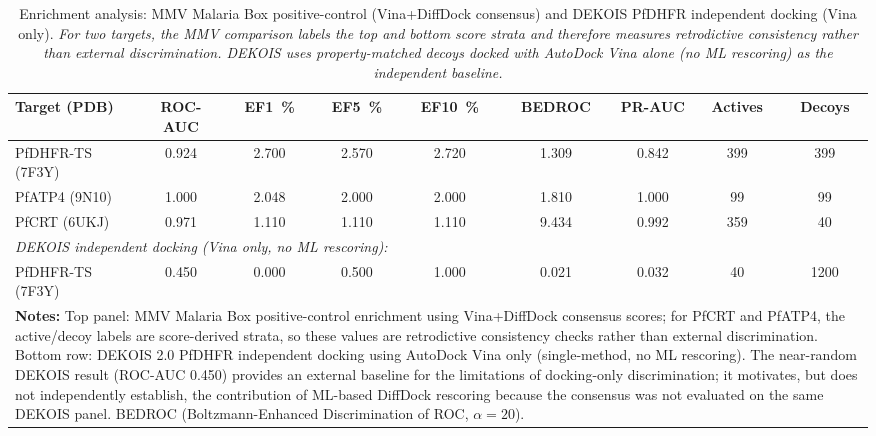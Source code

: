 \documentclass[journal=jcisd8,manuscript=suppinfo]{achemso}
\begin{document}
\begin{table}[!htbp]
\centering
\caption{Enrichment analysis: MMV Malaria Box positive-control (Vina+DiffDock consensus) and DEKOIS PfDHFR independent docking (Vina only). \textit{For two targets, the MMV comparison labels the top and bottom score strata and therefore measures retrodictive consistency rather than external discrimination. DEKOIS uses property-matched decoys docked with AutoDock Vina alone (no ML rescoring) as the independent baseline.}}
\scriptsize
\begin{tabular}{lcccccccc}
\toprule
\textbf{Target (PDB)} & \textbf{ROC-AUC} & \textbf{EF\qty{1}{\percent}} & \textbf{EF\qty{5}{\percent}} & \textbf{EF\qty{10}{\percent}} & \textbf{BEDROC} & \textbf{PR-AUC} & \textbf{Actives} & \textbf{Decoys} \\
\midrule
PfDHFR-TS (7F3Y) & \num{0.924} & \num{2.700} & \num{2.570} & \num{2.720} & \num{1.309} & \num{0.842} & \num{399} & \num{399} \\
PfATP4 (9N10) & \num{1.000} & \num{2.048} & \num{2.000} & \num{2.000} & \num{1.810} & \num{1.000} & \num{99} & \num{99} \\
PfCRT (6UKJ) & \num{0.971} & \num{1.110} & \num{1.110} & \num{1.110} & \num{9.434} & \num{0.992} & \num{359} & \num{40} \\
\midrule
\multicolumn{9}{l}{\textit{DEKOIS independent docking (Vina only, no ML rescoring):}} \\
PfDHFR-TS (7F3Y) & \num{0.450} & \num{0.000} & \num{0.500} & \num{1.000} & \num{0.021} & \num{0.032} & \num{40} & \num{1200} \\
\bottomrule
\multicolumn{9}{p{16cm}}{
\noindent\textbf{Notes:} Top panel: MMV Malaria Box positive-control enrichment using Vina+DiffDock consensus scores; for PfCRT and PfATP4, the active/decoy labels are score-derived strata, so these values are retrodictive consistency checks rather than external discrimination. Bottom row: DEKOIS 2.0 PfDHFR independent docking using AutoDock Vina only (single-method, no ML rescoring). The near-random DEKOIS result (ROC-AUC \num{0.450}) provides an external baseline for the limitations of docking-only discrimination; it motivates, but does not independently establish, the contribution of ML-based DiffDock rescoring because the consensus was not evaluated on the same DEKOIS panel. BEDROC (Boltzmann-Enhanced Discrimination of ROC, $\alpha = \num{20}$).}
\end{tabular}
\end{table}
\end{document}
